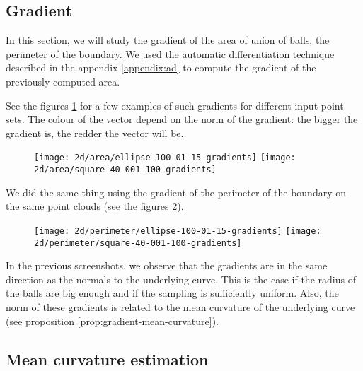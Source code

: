 \subsection{Gradient}

In this section, we will study the gradient of the area of union of balls, the
perimeter of the boundary. We used the automatic differentiation technique
described in the appendix \ref{appendix:ad} to compute the gradient of the
previously computed area.

See the figures \ref{fig:gradients_area_2d} for a few examples of such gradients
for different input point sets. The colour of the vector depend on the norm of
the gradient: the bigger the gradient is, the redder the vector will be.

\begin{figure}[h]
    \centering

    \texttt{[image: 2d/area/ellipse-100-01-15-gradients]}
    \texttt{[image: 2d/area/square-40-001-100-gradients]}
    \label{fig:gradients_area_2d}
\end{figure}

We did the same thing using the gradient of the perimeter of the boundary on the
same point clouds (see the figures \ref{fig:gradients_perimeter_2d}).

\begin{figure}[h]
    \centering
    \texttt{[image: 2d/perimeter/ellipse-100-01-15-gradients]}
    \texttt{[image: 2d/perimeter/square-40-001-100-gradients]}

    \label{fig:gradients_perimeter_2d}
\end{figure}

In the previous screenshots, we observe that the gradients are in the same
direction as the normals to the underlying curve. This is the case if the radius
of the balls are big enough and if the sampling is sufficiently uniform. Also,
the norm of these gradients is related to the mean curvature of the underlying
curve (see proposition \ref{prop:gradient-mean-curvature}).

\subsection{Mean curvature estimation}

